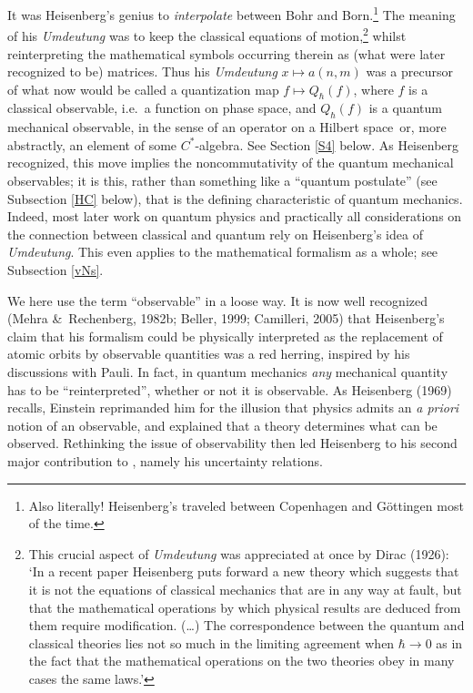 \documentclass[12pt]{article}
\newcommand{\ca}{$C^*$-algebra} \newcommand{\jba}{JB-algebra}
\newcommand{\Hs}{Hilbert space} \newcommand{\Bs}{Banach space}
\newcommand{\raw}{\rightarrow} \newcommand{\rat}{\mapsto}
\begin{document}
It was Heisenberg's genius to {\it interpolate} between Bohr and Born.\footnote{Also literally!  Heisenberg's traveled between Copenhagen and G\"{o}ttingen most of the time.} The meaning of his \textit{Umdeutung}  was to keep the classical equations of motion,\footnote{This crucial aspect of  \textit{Umdeutung} was appreciated at once by Dirac (1926): `In a recent paper Heisenberg puts forward a new theory which suggests that  it is not the equations of classical mechanics that are in any way at fault, but that the mathematical operations by which physical results are deduced from them require modification. (\ldots)  The correspondence between the quantum and classical theories lies not so much in the limiting agreement when $\hbar\raw 0$ as in the fact that the mathematical operations on the two theories obey in many cases the same laws.'}  whilst reinterpreting the mathematical symbols occurring therein as (what were later recognized to be) matrices. Thus his \textit{Umdeutung} $x\mapsto a(n,m)$ was a precursor of what now would be called a quantization map $f\mapsto Q_{\hbar}(f)$, where $f$ is a classical observable, i.e.\ a function on phase space, and $Q_{\hbar}(f)$ is a quantum mechanical observable, in the sense of an operator on a \Hs\ or, more abstractly, an element of some \ca. See Section \ref{S4} below. 
As Heisenberg recognized, this move implies the noncommutativity of the quantum mechanical observables; it is this, rather than something like a ``quantum postulate'' (see Subsection \ref{HC} below), that is the defining characteristic of quantum mechanics. Indeed, most later work on quantum physics and practically all considerations on the connection between classical and quantum rely on Heisenberg's idea of \textit{Umdeutung}. This even applies to the mathematical formalism as a whole; see Subsection \ref{vNs}. 

We here use the term ``observable'' in a loose way. It is now well recognized (Mehra \&\ Rechenberg, 1982b; Beller, 1999; Camilleri, 2005) that Heisenberg's claim that his formalism could be physically interpreted as the replacement of atomic orbits by observable quantities was a red herring, inspired by his discussions with Pauli.
 In fact, in quantum mechanics \textit{any} mechanical quantity has to be ``reinterpreted'', whether or not it is observable. As Heisenberg (1969) recalls, Einstein reprimanded him for the illusion that physics admits an \textit{a priori} notion of an observable, and explained that a theory determines what can be observed. Rethinking the issue of observability then led Heisenberg to his second major contribution to \qm, namely his uncertainty relations. 
\end{document}
